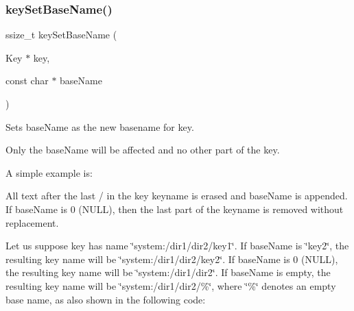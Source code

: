 \subsubsection{\texorpdfstring{key\+Set\+Base\+Name()}{keySetBaseName()}}
{\footnotesize\ttfamily ssize\+\_\+t key\+Set\+Base\+Name (\begin{DoxyParamCaption}\item[{Key $\ast$}]{key,  }\item[{const char $\ast$}]{base\+Name }\end{DoxyParamCaption})}



Sets {\ttfamily base\+Name} as the new basename for {\ttfamily key}. 

Only the base\+Name will be affected and no other part of the key.

A simple example is\+: 
 All text after the last {\ttfamily \textquotesingle{}/\textquotesingle{}} in the {\ttfamily key} keyname is erased and {\ttfamily base\+Name} is appended. If {\ttfamily base\+Name} is 0 (N\+U\+LL), then the last part of the keyname is removed without replacement.

Let us suppose {\ttfamily key} has name {\ttfamily \char`\"{}system\+:/dir1/dir2/key1\char`\"{}}. If {\ttfamily base\+Name} is {\ttfamily \char`\"{}key2\char`\"{}}, the resulting key name will be {\ttfamily \char`\"{}system\+:/dir1/dir2/key2\char`\"{}}. If {\ttfamily base\+Name} is 0 (N\+U\+LL), the resulting key name will be {\ttfamily \char`\"{}system\+:/dir1/dir2\char`\"{}}. If {\ttfamily base\+Name} is empty, the resulting key name will be {\ttfamily \char`\"{}system\+:/dir1/dir2/\%\char`\"{}}, where {\ttfamily \char`\"{}\%\char`\"{}} denotes an empty base name, as also shown in the following code\+:


